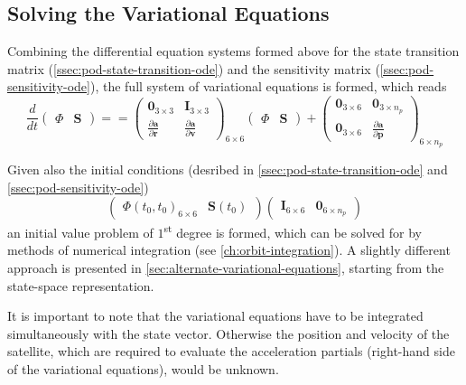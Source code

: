 \subsection{Solving the Variational Equations}\label{ssec:pod-varequations-solution}
Combining the differential equation systems formed above for the state transition matrix 
(\autoref{ssec:pod-state-transition-ode}) and the sensitivity matrix (\autoref{ssec:pod-sensitivity-ode}),
the full system of variational equations is formed, which reads
\begin{equation}\label{eq:mont745}
    \frac{d}{dt} \begin{pmatrix} \Phi & \bm{S} \end{pmatrix} = 
    = \begin{pmatrix}
        \bm{0}_{3 \times 3} & \bm{I}_{3 \times 3} \\
        \frac{\partial \bm{a}}{\partial \bm{r}} &
        \frac{\partial \bm{a}}{\partial \bm{v}}
    \end{pmatrix}_{6 \times 6} \begin{pmatrix} \Phi & \bm{S} \end{pmatrix}
    + 
    \begin{pmatrix}
        \bm{0}_{3 \times 6} & \bm{0}_{3 \times n_p} \\
        \bm{0}_{3 \times 6} & \frac{\partial \bm{a}}{\partial \bm{p}}
    \end{pmatrix}_{6 \times n_p}
\end{equation}

Given also the initial conditions (desribed in \autoref{ssec:pod-state-transition-ode} and 
\autoref{ssec:pod-sensitivity-ode})
\begin{equation}
    \begin{pmatrix}\Phi (t_0,t_0) _{6 \times 6} & \bm{S}(t_0) _{}\end{pmatrix}
    \begin{pmatrix} \bm{I}_{6 \times 6} & \bm{0}_{6 \times n_p} \end{pmatrix}
\end{equation}
an initial value problem of $1$\textsuperscript{st} degree is formed, which can 
be solved for by methods of numerical integration (see \autoref{ch:orbit-integration}).
A slightly different approach is presented in \autoref{sec:alternate-variational-equations}, 
starting from the state-space representation.

It is important to note that the variational equations have to be integrated 
simultaneously with the state vector. Otherwise the position and velocity of the 
satellite, which are required to evaluate the acceleration partials (right-hand 
side of the variational equations), would be unknown. 
